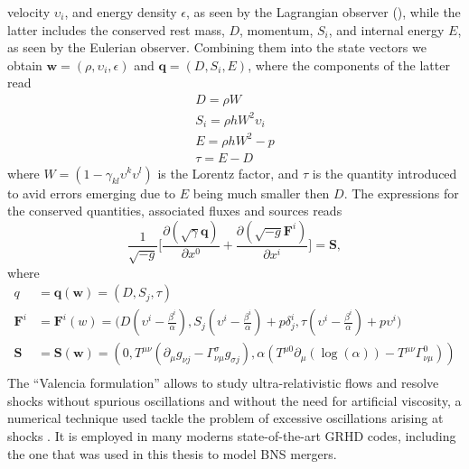 velocity $\upsilon_i$, and  energy density $\epsilon$, as seen by the 
Lagrangian observer (), while the latter includes 
the conserved rest mass, $D$, momentum, $S_i$, and internal energy $E$, as 
seen by the Eulerian observer.
Combining them into the state vectors we obtain $\boldsymbol{w}=(\rho,\upsilon_i,\epsilon)$
and $\boldsymbol{q}=(D,S_i,E)$, where the components of the latter read
%
\begin{subequations}
    \begin{align}
    D = \rho W \\
    S_i = \rho h W^2 \upsilon_i \\
    E = \rho h W^2 - p \\
    \tau = E - D
    \end{align}
\end{subequations}
%
where $W = (1 - \gamma_{kl}\upsilon^k\upsilon^l)$ is the Lorentz factor, and $\tau$ is the
quantity introduced to avid errors emerging due to $E$ being much smaller then $D$. 
%
The expressions for the conserved quantities, associated fluxes and sources reads 
%
\begin{equation}
\frac{1}{\sqrt{-g}}\Big[\frac{\partial(\sqrt{\gamma}\boldsymbol{q})}{\partial x^0} + \frac{\partial(\sqrt{-g}\boldsymbol{F}^{i})}{\partial x^i}\Big] = \boldsymbol{S},
\label{eq:theory:valencia} %
\end{equation}
%
where 
%
\begin{subequations}
    \begin{align}
    q &= \boldsymbol{q}(\boldsymbol{w}) = (D, S_j, \tau) \\
    \boldsymbol{F}^i &= \boldsymbol{F}^i(w) = \Big( D(\upsilon^i-\frac{\beta^i}{\alpha}), S_j(\upsilon^i-\frac{\beta^i}{\alpha}) + p\delta^i_j, \tau(\upsilon^i-\frac{\beta^i}{\alpha})+p\upsilon^i \Big) \\
    \boldsymbol{S} &= \boldsymbol{S}(\boldsymbol{w})=(0, T^{\mu\nu}(\partial_{\mu}g_{\nu j} - \Gamma^{\sigma}_{\nu\mu}g_{\sigma j}), \alpha(T^{\mu 0}\partial_{\mu}(\log(\alpha)) - T^{\mu\nu}\Gamma^0_{\nu\mu})) \\
    \end{align}
\end{subequations}
%
The ``Valencia formulation'' allows to study ultra-relativistic flows and resolve shocks without
 spurious oscillations and without the need for artificial viscosity, a numerical technique used 
tackle the problem of excessive oscillations arising at shocks \citep[\eg][]{Font:2008fka}.
%
It is employed in many moderns state-of-the-art \ac{GRHD} codes, including the one that was 
used in this thesis to model \ac{BNS} mergers. 

